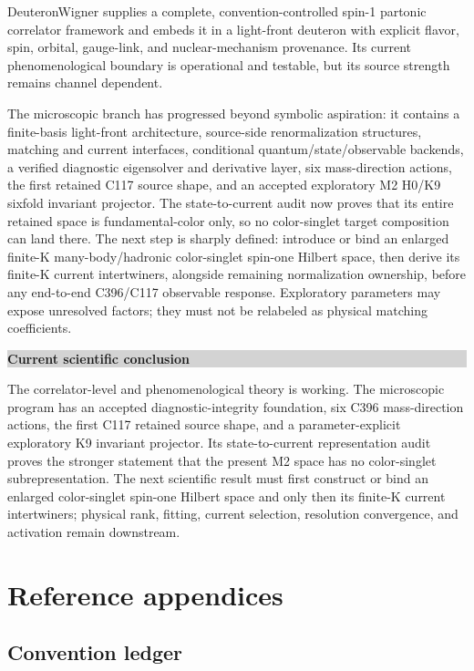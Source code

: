 \documentclass[11pt,oneside]{book}
\newenvironment{claimbox}[1]{%
  \begin{center}\begin{minipage}{0.94\textwidth}
  \colorbox{lightgray}{\parbox{0.96\textwidth}{\textbf{#1}}}\smallskip\par
}{%
  \end{minipage}\end{center}
}
\begin{document}
DeuteronWigner supplies a complete, convention-controlled spin-1 partonic correlator framework and embeds it in a light-front deuteron with explicit flavor, spin, orbital, gauge-link, and nuclear-mechanism provenance.  Its current phenomenological boundary is operational and testable, but its source strength remains channel dependent.

The microscopic branch has progressed beyond symbolic aspiration: it contains a finite-basis light-front architecture, source-side renormalization structures, matching and current interfaces, conditional quantum/state/observable backends, a verified diagnostic eigensolver and derivative layer, six mass-direction actions, the first retained C117 source shape, and an accepted exploratory M2 H0/K9 sixfold invariant projector. The state-to-current audit now proves that its entire retained space is fundamental-color only, so no color-singlet target composition can land there. The next step is sharply defined: introduce or bind an enlarged finite-K many-body/hadronic color-singlet spin-one Hilbert space, then derive its finite-K current intertwiners, alongside remaining normalization ownership, before any end-to-end C396/C117 observable response. Exploratory parameters may expose unresolved factors; they must not be relabeled as physical matching coefficients.

\begin{claimbox}{Current scientific conclusion}
The correlator-level and phenomenological theory is working. The microscopic program has an accepted diagnostic-integrity foundation, six C396 mass-direction actions, the first C117 retained source shape, and a parameter-explicit exploratory K9 invariant projector. Its state-to-current representation audit proves the stronger statement that the present M2 space has no color-singlet subrepresentation. The next scientific result must first construct or bind an enlarged color-singlet spin-one Hilbert space and only then its finite-K current intertwiners; physical rank, fitting, current selection, resolution convergence, and activation remain downstream.
\end{claimbox}

\appendix
\part{Reference appendices}

\chapter{Convention ledger}
\label{app:conventions}
\end{document}
